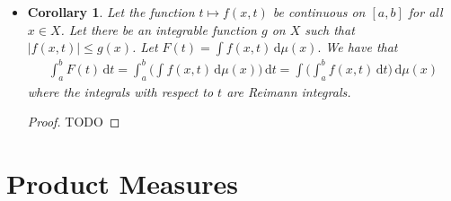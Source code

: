\documentclass[10pt]{article}
\newtheorem{corollary}[lemma]{Corollary}
\newcommand{\dee}{\mathrm{d}}
\begin{document}
\begin{itemize}
  \begin{proof}
    TODO
  \end{proof}

  \item \begin{corollary}
    Let the function $t \mapsto f(x,t)$ be continuous on $[a,b]$ for all $x \in X$. Let there be an integrable function $g$ on $X$ such that $|f(x,t)| \leq g(x)$. Let $F(t) = \int f(x,t)\, \dee\mu(x).$ We have that
    \begin{align*}
      \int_a^b F(t)\, \dee t 
      = \int_a^b \bigg( \int f(x,t)\, \dee\mu(x) \bigg)\, \dee t
      = \int \bigg( \int_a^b f(x,t)\, \dee t \bigg)\, \dee\mu(x)
    \end{align*}
    where the integrals with respect to $t$ are Reimann integrals.
  \end{corollary}

  \begin{proof}
    TODO
  \end{proof}
\end{itemize}

\section{Product Measures}
\end{document}
